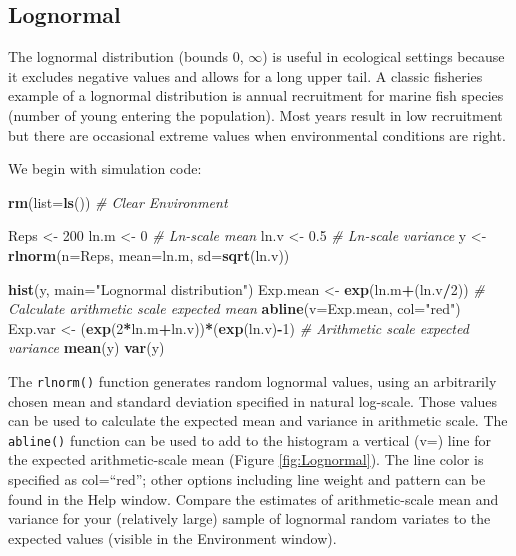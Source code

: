 \documentclass[
]{krantz}
\makeatletter
\newenvironment{Shaded}{\begin{snugshade}}{\end{snugshade}}
\newcommand{\AttributeTok}[1]{\textcolor[rgb]{0.27,0.27,0.27}{#1}}
\newcommand{\CommentTok}[1]{\textcolor[rgb]{0.37,0.37,0.37}{\textit{#1}}}
\newcommand{\DecValTok}[1]{\textcolor[rgb]{0.06,0.06,0.06}{#1}}
\newcommand{\FloatTok}[1]{\textcolor[rgb]{0.06,0.06,0.06}{#1}}
\newcommand{\FunctionTok}[1]{\textcolor[rgb]{0.27,0.27,0.27}{\textbf{#1}}}
\newcommand{\NormalTok}[1]{#1}
\newcommand{\OtherTok}[1]{\textcolor[rgb]{0.37,0.37,0.37}{#1}}
\newcommand{\SpecialCharTok}[1]{\textcolor[rgb]{0.43,0.43,0.43}{\textbf{#1}}}
\newcommand{\StringTok}[1]{\textcolor[rgb]{0.5,0.5,0.5}{#1}}
\newenvironment{kframe}{%
\medskip{}
\setlength{\fboxsep}{.8em}
 \def\at@end@of@kframe{}%
 \ifinner\ifhmode%
  \def\at@end@of@kframe{\end{minipage}}%
  \begin{minipage}{\columnwidth}%
 \fi\fi%
 \def\FrameCommand##1{\hskip\@totalleftmargin \hskip-\fboxsep
 \colorbox{shadecolor}{##1}\hskip-\fboxsep
     \hskip-\linewidth \hskip-\@totalleftmargin \hskip\columnwidth}%
 \MakeFramed {\advance\hsize-\width
   \@totalleftmargin\z@ \linewidth\hsize
   \@setminipage}}%
 {\par\unskip\endMakeFramed%
 \at@end@of@kframe}
\renewenvironment{Shaded}{\begin{kframe}}{\end{kframe}}
\makeatother
\begin{document}
\hypertarget{LognormalDist}{%
\subsection{Lognormal}\label{LognormalDist}}

The lognormal distribution (bounds 0, \(\infty\)) is useful in ecological settings because it excludes negative values and allows for a long upper tail. A classic fisheries example of a lognormal distribution is annual recruitment for marine fish species (number of young entering the population). Most years result in low recruitment but there are occasional extreme values when environmental conditions are right.

We begin with simulation code:

\begin{Shaded}
\begin{Highlighting}[]
\FunctionTok{rm}\NormalTok{(}\AttributeTok{list=}\FunctionTok{ls}\NormalTok{()) }\CommentTok{\# Clear Environment}

\NormalTok{Reps }\OtherTok{\textless{}{-}} \DecValTok{200}
\NormalTok{ln.m }\OtherTok{\textless{}{-}} \DecValTok{0} \CommentTok{\# Ln{-}scale mean}
\NormalTok{ln.v }\OtherTok{\textless{}{-}} \FloatTok{0.5} \CommentTok{\# Ln{-}scale variance}
\NormalTok{y }\OtherTok{\textless{}{-}} \FunctionTok{rlnorm}\NormalTok{(}\AttributeTok{n=}\NormalTok{Reps, }\AttributeTok{mean=}\NormalTok{ln.m, }\AttributeTok{sd=}\FunctionTok{sqrt}\NormalTok{(ln.v))}

\FunctionTok{hist}\NormalTok{(y, }\AttributeTok{main=}\StringTok{"Lognormal distribution"}\NormalTok{)}
\NormalTok{Exp.mean }\OtherTok{\textless{}{-}} \FunctionTok{exp}\NormalTok{(ln.m}\SpecialCharTok{+}\NormalTok{(ln.v}\SpecialCharTok{/}\DecValTok{2}\NormalTok{)) }\CommentTok{\# Calculate arithmetic scale expected mean}
\FunctionTok{abline}\NormalTok{(}\AttributeTok{v=}\NormalTok{Exp.mean, }\AttributeTok{col=}\StringTok{"red"}\NormalTok{)}
\NormalTok{Exp.var }\OtherTok{\textless{}{-}}\NormalTok{ (}\FunctionTok{exp}\NormalTok{(}\DecValTok{2}\SpecialCharTok{*}\NormalTok{ln.m}\SpecialCharTok{+}\NormalTok{ln.v))}\SpecialCharTok{*}\NormalTok{(}\FunctionTok{exp}\NormalTok{(ln.v)}\SpecialCharTok{{-}}\DecValTok{1}\NormalTok{) }\CommentTok{\# Arithmetic scale expected variance}
\FunctionTok{mean}\NormalTok{(y)}
\FunctionTok{var}\NormalTok{(y)}
\end{Highlighting}
\end{Shaded}

The \texttt{rlnorm()} function generates random lognormal values, using an arbitrarily chosen mean and standard deviation specified in natural log-scale. Those values can be used to calculate the expected mean and variance in arithmetic scale. The \texttt{abline()} function can be used to add to the histogram a vertical (v=) line for the expected arithmetic-scale mean (Figure \ref{fig:Lognormal}). The line color is specified as col=``red''; other options including line weight and pattern can be found in the Help window. Compare the estimates of arithmetic-scale mean and variance for your (relatively large) sample of lognormal random variates to the expected values (visible in the Environment window).
\end{document}
